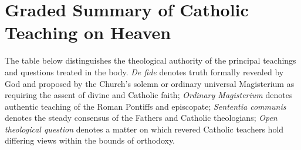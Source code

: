 \section{Graded Summary of Catholic Teaching on Heaven}

The table below distinguishes the theological authority of the principal teachings and questions treated in the body. \textit{De fide} denotes truth formally revealed by God and proposed by the Church's solemn or ordinary universal Magisterium as requiring the assent of divine and Catholic faith; \textit{Ordinary Magisterium} denotes authentic teaching of the Roman Pontiffs and episcopate; \textit{Sententia communis} denotes the steady consensus of the Fathers and Catholic theologians; \textit{Open theological question} denotes a matter on which revered Catholic teachers hold differing views within the bounds of orthodoxy.

